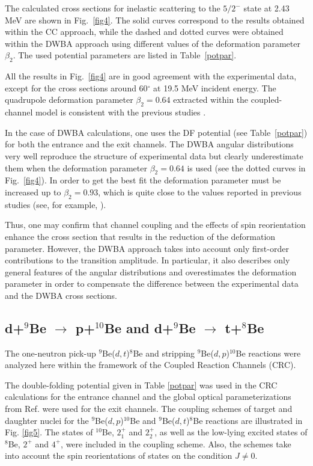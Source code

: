 \documentclass[
11pt, %
english, %
onehalfspacing, %
headsepline, %
]{MastersDoctoralThesis} %
\begin{document}
The calculated cross sections for inelastic scattering to the $5/2^-$ state at 2.43 MeV are shown in Fig.~\ref{fig4}. The solid curves correspond to the results obtained within the CC approach, while the dashed and dotted curves were obtained within the DWBA approach using  different values of the deformation parameter $\beta_2$. The used potential parameters are listed in Table~\ref{potpar}.

All the results in Fig.~\ref{fig4} are in good agreement with the experimental data, except for the cross sections around 60$^\circ$ at 19.5 MeV incident energy. The quadrupole deformation parameter $\beta_2 = 0.64$ extracted within the coupled-channel model is consistent with the previous studies \cite{lukyanov2014, harakeh1980}.

In the case of DWBA calculations, one uses the DF potential (see Table~\ref{potpar}) for both the entrance and the exit channels. The DWBA angular distributions very well reproduce the structure of experimental data but clearly underestimate them when the deformation parameter $\beta_2 = 0.64$ is used (see the dotted curves in Fig.~\ref{fig4}). In order to get the best fit the deformation parameter must be increased up to $\beta_2 = 0.93$, which is quite close to the values reported in previous studies (see, for example, \cite{bodek1989, votava1973}).


Thus, one may confirm that channel coupling and the effects of spin reorientation enhance the cross section that results in the reduction of the deformation parameter. However, the DWBA approach takes into account only first-order contributions to the transition amplitude. In particular, it also describes only general features of the angular distributions and overestimates the deformation parameter in order to compensate the difference between the experimental data and the DWBA cross sections.

\subsection{d+$^9$Be $\rightarrow$ p+$^{10}$Be and d+$^9$Be $\rightarrow$ t+$^{8}$Be}

The one-neutron pick-up ${}^9$Be($d,t$)${}^8$Be and stripping ${}^9$Be($d,p$)${}^{10}$Be reactions were analyzed here within the framework of  the Coupled Reaction Channels (CRC).

The double-folding potential given in Table \ref{potpar} was used in the CRC calculations for the entrance channel and the global optical parameterizations from Ref. \cite{globalProton, globalTriton} were used for the exit channels. The coupling schemes of target and daughter nuclei for the ${}^9$Be($d,p$)${}^{10}$Be and ${}^9$Be($d,t$)${}^8$Be  reactions  are illustrated in Fig. \ref{fig5}. The states of ${}^{10}$Be, $2^+_{1}$ and $2^+_{2}$, as well as the low-lying excited states of ${}^8$Be, $2^+$ and $4^+$, were included in the coupling scheme. Also, the schemes take into account the spin reorientations of states on the condition $J \neq 0$.
\end{document}
